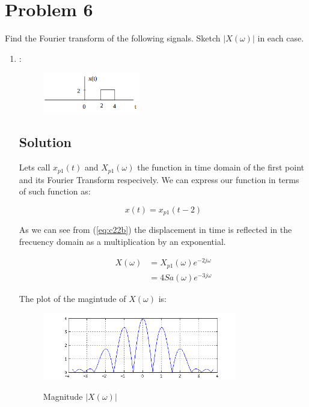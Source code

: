\section*{Problem 6}

Find the Fourier transform of the following signals. Sketch $|X(\omega)|$ in each case.

\begin{enumerate}
\item :
\begin{figure}[H]
\caption*{}
\centering
\includegraphics[width=0.4\textwidth]{figs/c2p6a.png}
\label{fig:c2p6a}
\end{figure} 
\subsection*{Solution}

Lets call $x_{p1}(t)$ and $X_{p1}(\omega)$ the function in time domain of the first point 
and its Fourier Transform respecively. 
We can express our function in terms of such function as:

\begin{equation*}
x(t) = x_{p1}(t-2)
\end{equation*} 

As we can see from (\ref{eq:c22b}) the displacement in time is reflected in the
frecuency domain as a multiplication by an exponential. 

\begin{equation*}
\begin{aligned}
X(\omega) &= X_{p1}(\omega) e^{- 2 j \omega} \\
&= 4 Sa(\omega) e^{-3 j \omega}
\end{aligned}
\end{equation*} 

The plot of the magintude of $X(\omega)$ is:

\begin{figure}[H]
\caption{Magnitude $|X(\omega)|$}
\centering
\includegraphics[width=0.8\textwidth]{figs/c2p6a1.png}
\label{fig:c2p6a1}
\end{figure} 


\end{enumerate}
